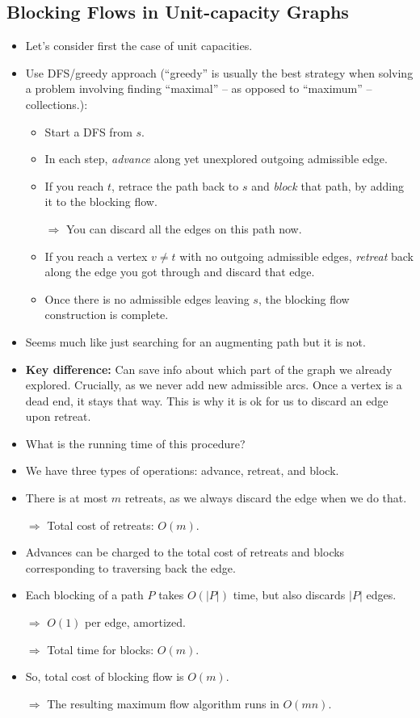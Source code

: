 \documentclass{article}
\begin{document}
\subsection{Blocking Flows in Unit-capacity Graphs}
\begin{itemize}
\item Let's consider first the case of unit capacities. 
\item Use DFS/greedy approach (``greedy'' is usually the best strategy when solving a problem involving finding ``maximal'' -- as opposed to ``maximum'' -- collections.):

\begin{itemize}
\item Start a DFS from $s$.
\item In each step, {\em advance} along yet unexplored outgoing admissible edge.
\item If you reach $t$, retrace the path back to $s$ and {\em block} that path, by adding it to the blocking flow. 

$\Rightarrow$ You can discard all the edges on this path now. 

\item If you reach a vertex $v\neq t$ with no outgoing admissible edges, {\em retreat} back along the edge you got through and discard that edge. 

\item Once there is no admissible edges leaving $s$, the blocking flow construction is complete.
\end{itemize}
\item Seems much like just searching for an augmenting path but it is not. 
\item {\bf Key difference:} Can save info about which part of the graph we already explored. Crucially, as we never add new admissible arcs. Once a vertex is a dead end, it stays that way. This is why it is ok for us to discard an edge upon retreat.
\item What is the running time of this procedure?
\item We have three types of operations: advance, retreat, and block. 
\item There is at most $m$ retreats, as we always discard the edge when we do that.

$\Rightarrow$ Total cost  of retreats: $O(m)$.
\item Advances can be charged to the total cost of retreats and blocks corresponding to traversing back the edge. 
\item Each blocking of a path $P$ takes $O(|P|)$ time, but also discards $|P|$ edges. 

$\Rightarrow$ $O(1)$ per edge, amortized.

$\Rightarrow$ Total time for blocks: $O(m)$.
\item So, total cost of blocking flow is $O(m)$.

$\Rightarrow$ The resulting maximum flow algorithm runs in $O(mn)$.
\end{itemize}
\end{document}
